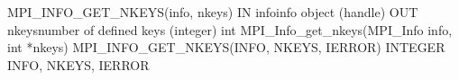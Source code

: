   MPI_INFO_GET_NKEYS(info, nkeys)
  IN infoinfo object (handle)
  OUT nkeysnumber of defined keys (integer)
  int MPI_Info_get_nkeys(MPI_Info info, int *nkeys)
  MPI_INFO_GET_NKEYS(INFO, NKEYS, IERROR)
  INTEGER INFO, NKEYS, IERROR

